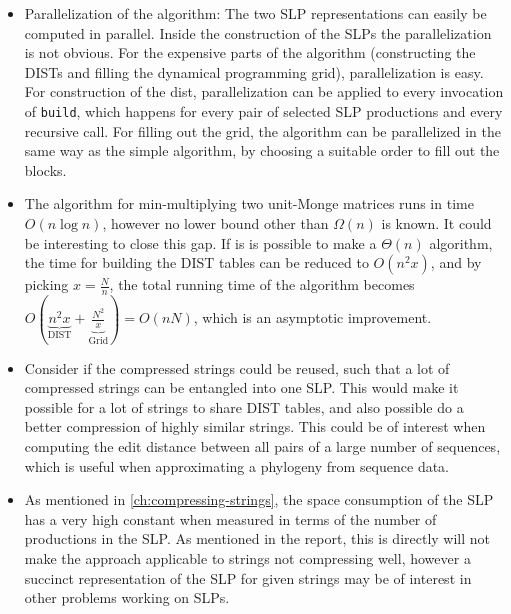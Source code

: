 \documentclass[twoside,11pt,openright]{report}
\newcommand{\DIST}{\operatorname{DIST}}
\begin{document}
\begin{itemize}
  \item Parallelization of the algorithm: The two SLP representations can easily be computed in parallel. Inside the construction of the SLPs the parallelization is not obvious.
  For the expensive parts of the algorithm (constructing the DISTs and filling the dynamical programming grid), parallelization is easy. For construction of the dist, parallelization can be applied to every invocation of \texttt{build}, which happens for every pair of selected SLP productions and every recursive call.
  For filling out the grid, the algorithm can be parallelized in the same way as the simple algorithm, by choosing a suitable order to fill out the blocks.

  \item The algorithm for min-multiplying two unit-Monge matrices runs in time $O(n \log{n})$, however no lower bound other than $\Omega(n)$ is known. It could be interesting to close this gap. If is is possible to make a $\Theta(n)$ algorithm, the time for building the DIST tables can be reduced to $O(n^2 x)$, and by picking $x = \frac{N}{n}$, the total running time of the algorithm becomes $O(\underbrace{n^2 x}_{\DIST} + \underbrace{\frac{N^2}{x}}_{\text{Grid}}) = O(nN)$, which is an asymptotic improvement.

  \item Consider if the compressed strings could be reused, such that a lot of compressed strings can be entangled into one SLP. This would make it possible for a lot of strings to share DIST tables, and also possible do a better compression of highly similar strings. This could be of interest when computing the edit distance between all pairs of a large number of sequences, which is useful when approximating a phylogeny from sequence data.

  \item As mentioned in \cref{ch:compressing-strings}, the space consumption of the SLP has a very high constant when measured in terms of the number of productions in the SLP. As mentioned in the report, this is directly will not make the approach applicable to strings not compressing well, however a succinct representation of the SLP for given strings may be of interest in other problems working on SLPs.
\end{itemize}


 

\end{document}
